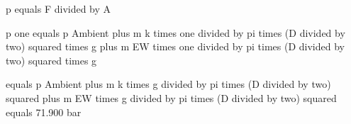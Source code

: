 p equals F divided by A

p one equals p Ambient plus m k times one divided by pi times (D divided by two) squared times g plus m EW times one divided by pi times (D divided by two) squared times g

equals p Ambient plus m k times g divided by pi times (D divided by two) squared plus m EW times g divided by pi times (D divided by two) squared equals 71.900 bar